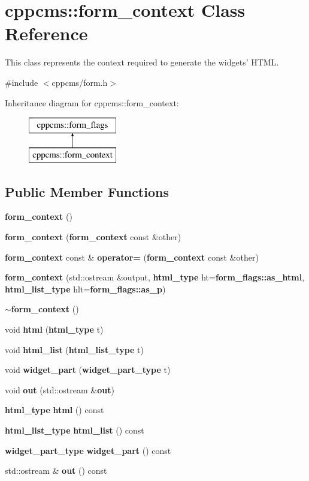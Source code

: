 \section{cppcms\-:\-:form\-\_\-context \-Class \-Reference}
\label{classcppcms_1_1form__context}


\-This class represents the context required to generate the widgets' \-H\-T\-M\-L.  




{\ttfamily \#include $<$cppcms/form.\-h$>$}

\-Inheritance diagram for cppcms\-:\-:form\-\_\-context\-:\begin{figure}[H]
\begin{center}
\leavevmode
\includegraphics[height=2.000000cm]{classcppcms_1_1form__context}
\end{center}
\end{figure}
\subsection*{\-Public \-Member \-Functions}
\begin{DoxyCompactItemize}
\item 
{\bf form\-\_\-context} ()
\item 
{\bf form\-\_\-context} ({\bf form\-\_\-context} const \&other)
\item 
{\bf form\-\_\-context} const \& {\bf operator=} ({\bf form\-\_\-context} const \&other)
\item 
{\bf form\-\_\-context} (std\-::ostream \&output, {\bf html\-\_\-type} ht={\bf form\-\_\-flags\-::as\-\_\-html}, {\bf html\-\_\-list\-\_\-type} hlt={\bf form\-\_\-flags\-::as\-\_\-p})
\item 
{\bf $\sim$form\-\_\-context} ()
\item 
void {\bf html} ({\bf html\-\_\-type} t)
\item 
void {\bf html\-\_\-list} ({\bf html\-\_\-list\-\_\-type} t)
\item 
void {\bf widget\-\_\-part} ({\bf widget\-\_\-part\-\_\-type} t)
\item 
void {\bf out} (std\-::ostream \&{\bf out})
\item 
{\bf html\-\_\-type} {\bf html} () const 
\item 
{\bf html\-\_\-list\-\_\-type} {\bf html\-\_\-list} () const 
\item 
{\bf widget\-\_\-part\-\_\-type} {\bf widget\-\_\-part} () const 
\item 
std\-::ostream \& {\bf out} () const 
\end{DoxyCompactItemize}


